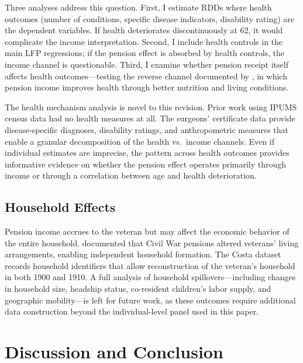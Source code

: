 \documentclass[12pt]{article}
\begin{document}


Three analyses address this question. First, I estimate RDDs where health outcomes (number of conditions, specific disease indicators, disability rating) are the dependent variables. If health deteriorates discontinuously at 62, it would complicate the income interpretation. Second, I include health controls in the main LFP regressions; if the pension effect is absorbed by health controls, the income channel is questionable. Third, I examine whether pension receipt itself affects health outcomes---testing the reverse channel documented by \citet{eli2015income}, in which pension income improves health through better nutrition and living conditions.

The health mechanism analysis is novel to this revision. Prior work using IPUMS census data had no health measures at all. The surgeons' certificate data provide disease-specific diagnoses, disability ratings, and anthropometric measures that enable a granular decomposition of the health vs.\ income channels. Even if individual estimates are imprecise, the pattern across health outcomes provides informative evidence on whether the pension effect operates primarily through income or through a correlation between age and health deterioration.

\subsection{Household Effects}

Pension income accrues to the veteran but may affect the economic behavior of the entire household. \citet{costa1997displacing} documented that Civil War pensions altered veterans' living arrangements, enabling independent household formation. The Costa dataset records household identifiers that allow reconstruction of the veteran's household in both 1900 and 1910. A full analysis of household spillovers---including changes in household size, headship status, co-resident children's labor supply, and geographic mobility---is left for future work, as these outcomes require additional data construction beyond the individual-level panel used in this paper.


\section{Discussion and Conclusion}
\end{document}
